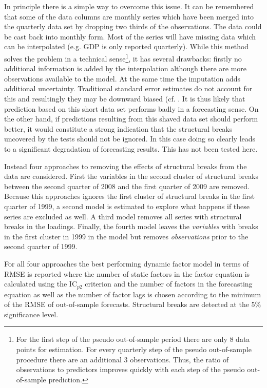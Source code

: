 \documentclass[11pt]{article}
\begin{document}
In principle there is a simple way to overcome this issue. It can be remembered that some of the data columns are monthly series which have been merged into the quarterly data set by dropping two thirds of the observations. The data could be cast back into monthly form. Most of the series will have missing data which can be interpolated (e.g. GDP is only reported quarterly). While this method solves the problem in a technical sense\footnote{For the first step of the pseudo out-of-sample period there are only $8$ data points for estimation. For every quarterly step of the pseudo out-of-sample procedure there are an additional $3$ observations. Thus, the ratio of observations to predictors improves quickly with each step of the pseudo out-of-sample prediction.}, it has several drawbacks: firstly no additional information is added by the interpolation although there are more observations available to the model. At the same time the imputation adds additional uncertainty. Traditional standard error estimates do not account for this and resultingly they may be downward biased (cf. \citet[chapter~25]{gelman2006missing}. It is thus likely that prediction based on this short data set performs badly in a forecasting sense. On the other hand, if predictions resulting from this shaved data set should perform better, it would constitute a strong indication that the structural breaks uncovered by the tests should not be ignored. In this case doing so clearly leads to a significant degradation of forecasting results. This has not been tested here. 

Instead four approaches to removing the effects of structural breaks from the data are considered. First the variables in the second cluster of structural breaks between the second quarter of 2008 and the first quarter of 2009 are removed. Because this approaches ignores the first cluster of structural breaks in the first quarter of 1999, a second model is estimated to explore what happens if these series are excluded as well. A third model removes all series with structural breaks in the loadings. Finally, the fourth model leaves the \textit{variables} with breaks in the first cluster in 1999 in the model but removes \textit{observations} prior to the second quarter of 1999. 

For all four approaches the best performing dynamic factor model in terms of RMSE is reported where the number of static factors in the factor equation is calculated using the IC$_{p2}$ criterion and the number of factors in the forecasting equation as well as the number of factor lags is chosen according to the minimum of the RMSE of out-of-sample forecasts. Structural breaks are detected at the $5\%$ significance level.
\end{document}
